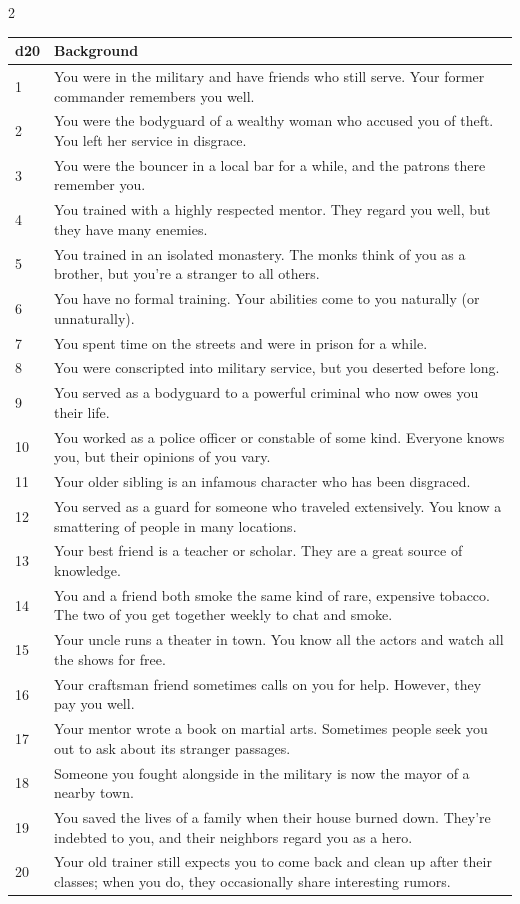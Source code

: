 \begin{multicols}{2}
\begin{table}
\begin{tabularx}{\textwidth}{| p{} | p{} |}
\hline
\textbf{d20} & \textbf{Background} \\
\hline
1 & You were in the military and have friends who still serve. Your former commander remembers you well.\\ \hline
2 & You were the bodyguard of a wealthy woman who accused you of theft. You left her service in disgrace.  \\ \hline
3 & You were the bouncer in a local bar for a while, and the patrons there remember you.  \\ \hline
4 & You trained with a highly respected mentor. They regard you well, but they have many enemies.  \\ \hline
5 & You trained in an isolated monastery. The monks think of you as a brother, but you’re a stranger to all others.  \\ \hline
6 & You have no formal training. Your abilities come to you naturally (or unnaturally).  \\ \hline
7 & You spent time on the streets and were in prison for a while. \\ \hline
8 & You were conscripted into military service, but you deserted before long.  \\ \hline
9 & You served as a bodyguard to a powerful criminal who now owes you their life.  \\ \hline
10 & You worked as a police officer or constable of some kind. Everyone knows you, but their opinions of you vary.  \\ \hline
11 & Your older sibling is an infamous character who has been disgraced. \\ \hline
12 & You served as a guard for someone who traveled extensively. You know a smattering of people in many locations. \\ \hline
13 & Your best friend is a teacher or scholar. They are a great source of knowledge. \\ \hline
14 & You and a friend both smoke the same kind of rare, expensive tobacco. The two of you get together weekly to chat and smoke. \\ \hline
15 & Your uncle runs a theater in town. You know all the actors and watch all the shows for free. \\ \hline
16 & Your craftsman friend sometimes calls on you for help. However, they pay you well. \\ \hline
17 & Your mentor wrote a book on martial arts. Sometimes people seek you out to ask about its stranger passages. \\ \hline
18 & Someone you fought alongside in the military is now the mayor of a nearby town. \\ \hline
19 & You saved the lives of a family when their house burned down. They’re indebted to you, and their neighbors regard you as a hero. \\ \hline
20 & Your old trainer still expects you to come back and clean up after their classes; when you do, they occasionally share interesting rumors. \\ \hline


\end{tabularx}
\end{table}
\end{multicols}

